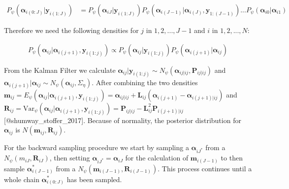 \documentclass[
]{article}
\begin{document}
\begin{equation*}
\begin{aligned}
P_\psi(\boldsymbol{\alpha}_{i(0:J)}|\boldsymbol{y}_{i(1:J)}) &=  P_\psi(\boldsymbol{\alpha}_{iJ}|\boldsymbol{y}_{i(1:J)})P_\psi(\boldsymbol{\alpha}_{i(J-1)}|\boldsymbol{\alpha}_{i(J)}, \boldsymbol{y}_{1:(J-1)}) ...  P_\psi(\boldsymbol{\alpha}_{i0}|\boldsymbol{\alpha}_{i1})
\end{aligned}
\end{equation*}

Therefore we need the following densities for \(j\) in \(1, 2, ..., J-1\) and \(i\) in \(1, 2, ..., N\):

\begin{equation*}
\begin{aligned}
P_\psi(\boldsymbol{\alpha}_{ij}|\boldsymbol{\alpha}_{i(j+1)}, \boldsymbol{y}_{i(1:j)}) \propto P_\psi(\boldsymbol{\alpha}_{ij}| \boldsymbol{y}_{i(1:j)})P_\psi(\boldsymbol{\alpha}_{i(j+1)}| \boldsymbol{\alpha}_{ij})
\end{aligned}
\end{equation*}

From the Kalman Filter we calculate \(\boldsymbol{\alpha}_{ij}|\boldsymbol{y}_{i(1:j)} \sim N_\psi(\boldsymbol{\alpha}_{ij|ij}, \boldsymbol{P}_{ij|ij})\) and \(\boldsymbol{\alpha}_{i(j+1)}|\boldsymbol{\alpha}_{ij} \sim N_\psi(\boldsymbol{\alpha}_{ij}, \Sigma_\eta)\). After combining the two densities \(\boldsymbol{m}_{ij} = E_\psi(\boldsymbol{\alpha}_{ij}| \boldsymbol{\alpha}_{i(j+1)},\boldsymbol{y}_{i(1:j)}) = \boldsymbol{\alpha}_{ij|ij} + \boldsymbol{L}_{ij} (\boldsymbol{\alpha}_{i(j+1)} - \boldsymbol{\alpha}_{i(j+1)|ij})\) and \(\boldsymbol{R}_{ij} = \text{Var}_\psi(\boldsymbol{\alpha}_{ij}| \boldsymbol{\alpha}_{i(j+1)},\boldsymbol{y}_{i(1:j)})= \boldsymbol{P}_{ij|ij} - \boldsymbol{L}_{ij}^2 \boldsymbol{P}_{i(j+1)|ij}\) {[}@shumway\_stoffer\_2017{]}. Because of normality, the posterior distribution for \(\boldsymbol{\alpha}_{ij}\) is \(N(\boldsymbol{m}_{ij}, \boldsymbol{R}_{ij})\).

For the backward sampling procedure we start by sampling a \(\boldsymbol{\alpha}_{iJ^*}\) from a \(N_\psi(m_{iJ}, \boldsymbol{R}_{iJ})\), then setting \(\boldsymbol{\alpha}_{iJ^*} = \boldsymbol{\alpha}_{iJ}\) for the calculation of \(\boldsymbol{m}_{i(J-1)}\) to then sample \(\boldsymbol{\alpha}_{i(J-1)}^*\) from a \(N_\psi(\boldsymbol{m}_{i(J-1)}, \boldsymbol{R}_{i(J-1)})\). This process continues until a whole chain \(\boldsymbol{\alpha}_{i(0:J)}^*\) has been sampled.
\end{document}
